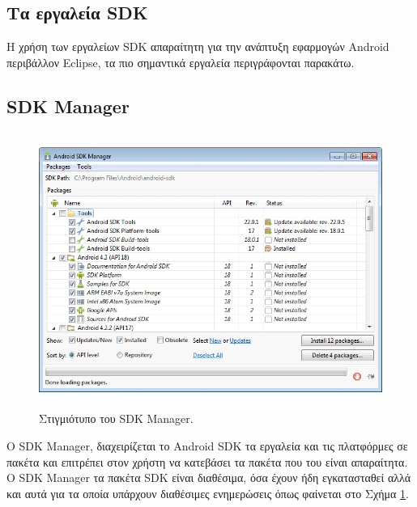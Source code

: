 \documentclass[12pt,twoside,openright]{report}
\begin{document}
\subsection*{Τα εργαλεία \lt SDK\gt}
Η χρήση των εργαλείων \lt SDK  απαραίτητη για την ανάπτυξη εφαρμογών \lt Android  περιβάλλον \lt Eclipse\gt, τα πιο σημαντικά εργαλεία περιγράφονται παρακάτω.
\subsection{\lt SDK Manager\gt}
\begin{figure}[H]
\centering
\includegraphics[height=9cm]{images/sdk_manager}
\caption{Στιγμιότυπο του \lt SDK Manager.\gt}
\label{fig:SDKmanager}
\end{figure}
Ο \lt SDK Manager\gt, διαχειρίζεται το \lt Android SDK  τα εργαλεία και τις πλατφόρμες σε πακέτα και επιτρέπει στον χρήστη να κατεβάσει τα πακέτα που του είναι απαραίτητα. O \lt SDK Manager  τα πακέτα \lt SDK  είναι διαθέσιμα, όσα έχουν ήδη εγκατασταθεί αλλά και αυτά για τα οποία υπάρχουν διαθέσιμες ενημερώσεις όπως φαίνεται στο Σχήμα \ref{fig:SDKmanager}.
\end{document}
